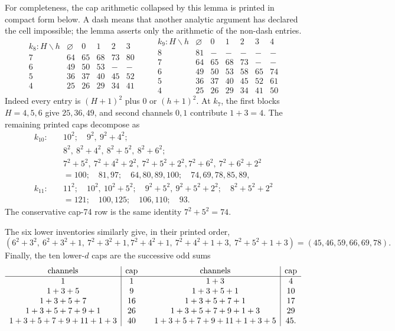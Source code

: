 \documentclass[11pt]{article}
\theoremstyle{definition}
\theoremstyle{remark}
\begin{document}
For completeness, the cap arithmetic collapsed by this lemma is printed
in compact form below.  A dash means that another analytic argument has
declared the cell impossible; the lemma asserts only the arithmetic of
the non-dash entries.
\[
\begin{array}{c|ccccc}
k_8:H\backslash h&\varnothing&0&1&2&3\\ \hline
7&64&65&68&73&80\\
6&49&50&53&-&-\\
5&36&37&40&45&52\\
4&25&26&29&34&41
\end{array}
\qquad
\begin{array}{c|cccccc}
k_9:H\backslash h&\varnothing&0&1&2&3&4\\ \hline
8&81&-&-&-&-&-\\
7&64&65&68&73&-&-\\
6&49&50&53&58&65&74\\
5&36&37&40&45&52&61\\
4&25&26&29&34&41&50
\end{array}
\]
Indeed every entry is \((H+1)^2\) plus \(0\) or \((h+1)^2\).
At \(k_7\), the first blocks \(H=4,5,6\) give
\(25,36,49\), and second channels \(0,1\) contribute \(1+3=4\).
The remaining printed caps decompose as
\begin{align*}
k_{10}:\quad&10^2;\quad9^2,\ 9^2+4^2;\\
&8^2,\ 8^2+4^2,\ 8^2+5^2,\ 8^2+6^2;\\
&7^2+5^2,\ 7^2+4^2+2^2,\ 7^2+5^2+2^2,
  7^2+6^2,\ 7^2+6^2+2^2\\
&=100;\quad81,97;\quad64,80,89,100;\quad74,69,78,85,89,\\[2mm]
k_{11}:\quad&11^2;\quad10^2,\ 10^2+5^2;\quad
9^2+5^2,\ 9^2+5^2+2^2;\quad8^2+5^2+2^2\\
&=121;\quad100,125;\quad106,110;\quad93.
\end{align*}
The conservative cap-74 row is the same identity \(7^2+5^2=74\).

The six lower inventories similarly give, in their printed order,
\[
 (6^2+3^2,\ 6^2+3^2+1,\ 7^2+3^2+1,
  7^2+4^2+1,\ 7^2+4^2+1+3,\ 7^2+5^2+1+3)
 =(45,46,59,66,69,78).
\]
Finally, the ten lower-\(d\) caps are the successive odd sums
\[
\begin{array}{c|c@{\qquad}c|c}
\text{channels}&\text{cap}&\text{channels}&\text{cap}\\ \hline
1&1&1+3&4\\
1+3+5&9&1+3+5+1&10\\
1+3+5+7&16&1+3+5+7+1&17\\
1+3+5+7+9+1&26&1+3+5+7+9+1+3&29\\
1+3+5+7+9+11+1+3&40&
1+3+5+7+9+11+1+3+5&45.
\end{array}
\]
\end{document}
